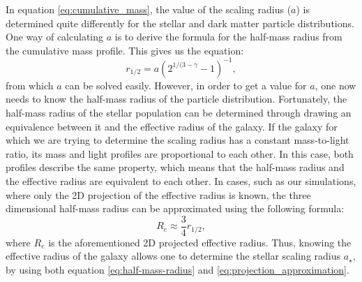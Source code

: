 \documentclass[english, oneside]{HYgradu}
\begin{document}
In equation \ref{eq:cumulative_mass}, the value of the scaling radius ($a$) is determined quite differently for the stellar and dark matter particle distributions. One way of calculating $a$ is to derive the formula for the half-mass radius from the cumulative mass profile. This gives us the equation:
\begin{equation}
r_{1/2} = a \left( 2^{1/(3-\gamma}-1 \right)^{-1}, \label{eq:half-mass-radius}
\end{equation}
from which $a$ can be solved easily. However, in order to get a value for $a$, one now needs to know the half-mass radius of the particle distribution. Fortunately, the half-mass radius of the stellar population can be determined through drawing an equivalence between it and the effective radius of the galaxy. If the galaxy for which we are trying to determine the scaling radius has a constant mass-to-light ratio, its mass and light profiles are proportional to each other. In this case, both profiles describe the same property, which means that the half-mass radius and the effective radius are equivalent to each other. In cases, such as our simulations, where only the 2D projection of the effective radius is known, the three dimensional half-mass radius can be approximated using the following formula:
\begin{equation}
R_e \approx \frac{3}{4} r_{1/2}, \label{eq:projection_approximation}
\end{equation} 
where $R_e$ is the aforementioned 2D projected effective radius. Thus, knowing the effective radius of the galaxy allows one to determine the stellar scaling radius $a_\star$, by using both equation \ref{eq:half-mass-radius} and \ref{eq:projection_approximation}.
\end{document}

